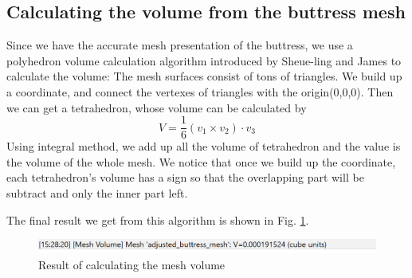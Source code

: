\documentclass[runningheads,a4paper]{llncs}
\begin{document}
\subsection{Calculating the volume from the buttress mesh}
Since we have the accurate mesh presentation of the buttress, we use a polyhedron volume calculation algorithm introduced by Sheue-ling and James to calculate the volume\cite{17}:
The mesh surfaces consist of tons of triangles. We build up a coordinate, and connect the vertexes of triangles with the origin(0,0,0). Then we can get a tetrahedron, whose volume can be calculated by
\begin{equation}
V = \frac{1}{6}(v_1 \times v_2) \cdot v_3
\end{equation}
Using integral method, we add up all the volume of tetrahedron and the value is the volume of the whole mesh. We notice that once we build up the coordinate, each tetrahedron’s  volume has a sign so that the overlapping part will be subtract and only the inner part left. 

The final result we get from this algorithm is shown in Fig. \ref{fig:mesh-volume}.

\begin{figure}
\centering
\includegraphics[scale=0.8]{finalresults.PNG}
\caption{Result of calculating the mesh volume}
\label{fig:mesh-volume}
\end{figure}
\end{document}
